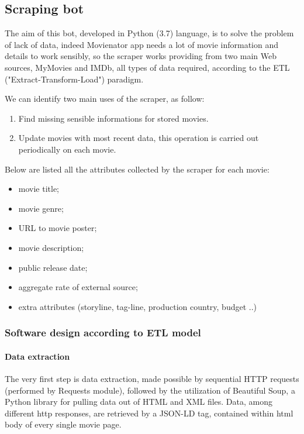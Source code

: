 \documentclass[11pt]{article}
\begin{document}
\subsection{Scraping bot}
The aim of this bot, developed in Python (3.7) language, is to solve the problem of lack of data, indeed Movienator app needs a lot of movie information and details to work sensibly, so the scraper works providing from two main Web sources, MyMovies and IMDb, all types of data required, according to the ETL ("Extract-Transform-Load") paradigm.

We can identify two main uses of the scraper, as follow:
\begin{enumerate}
    \item Find missing sensible informations for stored movies.
    \item Update movies with most recent data, this operation is carried out periodically on each movie.
\end{enumerate}

Below are listed all the attributes collected by the scraper for each movie:

\begin{itemize}
    \item movie title;
    \item movie genre;
    \item URL to movie poster;
    \item movie description;
    \item public release date;
    \item aggregate rate of external source;
    \item extra attributes (storyline, tag-line, production country, budget ..)
\end{itemize}

\subsubsection{Software design according to ETL model}
\paragraph{Data extraction}
The very first step is data extraction, made possible by sequential HTTP requests (performed by Requests module), followed by the utilization of Beautiful Soup, a Python library for pulling data out of HTML and XML files.
Data, among different http responses, are retrieved by a JSON-LD tag, contained within html body of every single movie page.

\end{document}
